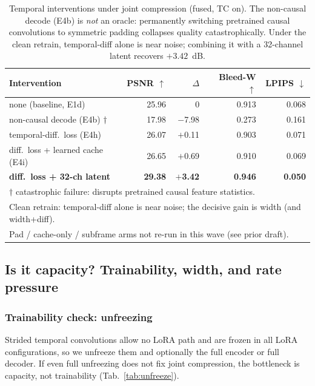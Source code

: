\begin{table}[t]
\centering
\caption{Temporal interventions under joint compression (fused, TC on). The non-causal decode (E4b) is \emph{not} an oracle: permanently switching pretrained causal convolutions to symmetric padding collapses quality catastrophically. Under the clean retrain, temporal-diff alone is near noise; combining it with a 32-channel latent recovers ${+}3.42$~dB.}
\label{tab:interventions}
\begin{tabular}{lrrrr}
\toprule
Intervention & PSNR $\uparrow$ & $\Delta$ & Bleed-W $\uparrow$ & LPIPS $\downarrow$ \\
\midrule
none (baseline, E1d)                        & 25.96 & 0       & 0.913 & 0.068 \\
non-causal decode (E4b) $\dagger$           & 17.98 & $-$7.98 & 0.273 & 0.161 \\
\midrule
temporal-diff.\ loss (E4h)                  & 26.07 & $+$0.11 & 0.903 & 0.071 \\
diff.\ loss + learned cache (E4i)           & 26.65 & $+$0.69 & 0.910 & 0.069 \\
\midrule
\textbf{diff.\ loss + 32-ch latent}         & \textbf{29.38} & $\mathbf{+}$\textbf{3.42} & \textbf{0.946} & \textbf{0.050} \\
\bottomrule
\multicolumn{5}{l}{\small $\dagger$ catastrophic failure: disrupts pretrained causal feature statistics.}\\
\multicolumn{5}{l}{\small Clean retrain: temporal-diff alone is near noise; the decisive gain is width (and width+diff).}\\
\multicolumn{5}{l}{\small Pad / cache-only / subframe arms not re-run in this wave (see prior draft).}\\
\end{tabular}
\end{table}



\subsection{Is it capacity? Trainability, width, and rate pressure}


\subsubsection{Trainability check: unfreezing}

Strided temporal convolutions allow no LoRA path and are frozen in all LoRA configurations, so we unfreeze them and optionally the full encoder or full decoder. If even full unfreezing does not fix joint compression, the bottleneck is capacity, not trainability (Tab.~\ref{tab:unfreeze}).

